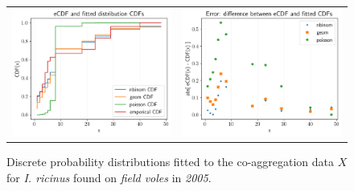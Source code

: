 \documentclass[hidelinks]{article}
\begin{document}
\begin{figure}[]
	\begin{mdframed}[backgroundcolor=grey250,rightline=false,leftline=false,topline=false]
	\centering
	\begin{tabular}{ll}
		\includegraphics[width=.48\linewidth,valign=m]{CDF_compare_2005_I.ricinus_FV} & \includegraphics[width=.48\linewidth,valign=m]{CDF_errors_2005_I.ricinus_FV}
	\end{tabular}
	\caption{Discrete probability distributions fitted to the co-aggregation data $ X $ for \textit{I. ricinus} found on \textit{field voles} in \textit{2005}.}
	\label{fig:CDF_2005_iricnus_FV}
	\end{mdframed}
\end{figure}
\end{document}
